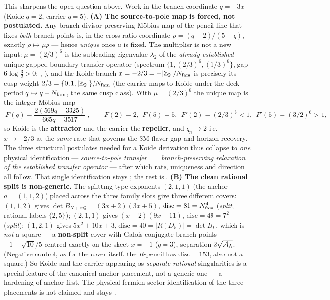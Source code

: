 \begin{keybox}
This sharpens the open question above. Work in the branch coordinate $q=-3x$ (Koide $q=2$, carrier $q=5$).
\textbf{(A) The source-to-pole map is forced, not postulated.} Any branch-divisor-preserving M\"obius map of the
pencil line that fixes \emph{both} branch points is, in the cross-ratio coordinate $\rho=(q-2)/(5-q)$, exactly
$\rho\mapsto\mu\rho$ --- hence \emph{unique} once $\mu$ is fixed. The multiplier is not a new input: $\mu=(2/3)^6$
is the subleading eigenvalue $\lambda_2$ of the \emph{already-established} unique gapped boundary transfer operator
(spectrum $\{1,(2/3)^6,(1/3)^6\}$, gap $6\log\tfrac32>0$; , ),
and the Koide branch $x=-2/3=-|\mathbb{Z}_2|/N_{\mathrm{fam}}$ is precisely its cusp weight $2/3=\{0,1,|\mathbb{Z}_2|\}/N_{\mathrm{fam}}$ (the carrier maps to
Koide under the deck period $q\mapsto q-N_{\mathrm{fam}}$, the same cusp class). With $\mu=(2/3)^6$ the unique map is the integer
M\"obius map
\[
  \boxed{\ F(q)=\frac{2(569q-3325)}{665q-3517}\ },\qquad F(2)=2,\ \ F(5)=5,\ \ F'(2)=(2/3)^6<1,\ \ F'(5)=(3/2)^6>1,
\]
so Koide is the \textbf{attractor} and the carrier the \textbf{repeller}, and $q_n\to2$ i.e.\ $x\to-2/3$ at the
\emph{same} rate that governs the SM flavor gap and horizon recovery. The three structural postulates needed for a
Koide derivation thus collapse to \emph{one} physical identification --- \emph{source-to-pole transfer $=$
branch-preserving relaxation of the established transfer operator} --- after which rate, uniqueness and direction
all follow. That single identification stays \mC; the rest is \mE. \textbf{(B) The clean rational split is
non-generic.} The splitting-type exponents $(2,1,1)$ (the anchor $a=(1,1,2)$) placed across the three family slots
give three different covers: $(1,1,2)$ gives $\det B_{K+xQ}=(3x+2)(3x+5)$, $\mathrm{disc}=81=N_{\mathrm{fam}}^4$ (\emph{split},
rational labels $\{2,5\}$); $(2,1,1)$ gives $(x+2)(9x+11)$, $\mathrm{disc}=49=7^2$ (\emph{split}); $(1,2,1)$ gives
$5x^2+10x+3$, $\mathrm{disc}=40=|R(D_5)|=\det B_L$, which is \emph{not} a square --- a \textbf{non-split} cover with
Galois-conjugate branch points $-1\pm\sqrt{10}/5$ centred exactly on the sheet $x=-1$ ($q=3$), separation
$2\sqrt{\mathcal A_\Lambda}$. (Negative control, as for the cover itself: the $R$-pencil has $\mathrm{disc}=153$, also not a
square.) So Koide and the carrier appearing as \emph{separate rational} singularities is a special feature of the
canonical anchor placement, not a generic one --- a hardening of anchor-first. The physical fermion-sector
identification of the three placements is not claimed and stays \mC.
\end{keybox}
